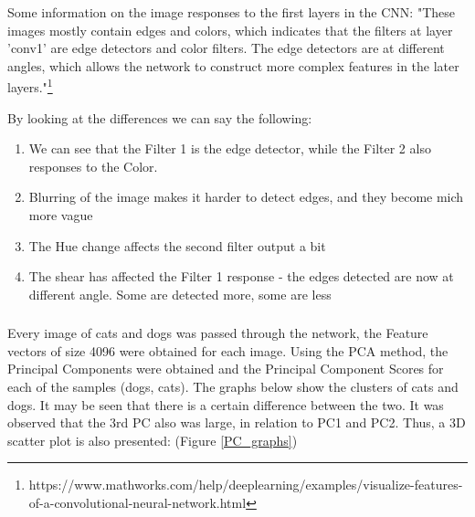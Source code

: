 \documentclass[a4paper]{iacas}
\begin{document}
Some information on the image responses to the first layers in the CNN:
"These images mostly contain edges and colors, which indicates that the filters at layer 'conv1' are edge detectors and color filters. The edge detectors are at different angles, which allows the network to construct more complex features in the later layers."\footnote{https://www.mathworks.com/help/deeplearning/examples/visualize-features-of-a-convolutional-neural-network.html }

By looking at the differences we can say the following:

\begin{enumerate}
\item We can see that the Filter 1 is the edge detector, while the Filter 2 also responses to the Color.
\item Blurring of the image makes it harder to detect edges, and they become mich more vague
\item The Hue change affects the second filter output a bit
\item The shear has affected the Filter 1 response - the edges detected are now at different angle. Some are detected more, some are less
\end{enumerate}



\subsubsection{}
Every image of cats and dogs was passed through the network, the Feature vectors of size 4096 were obtained for each image. Using the PCA method, the Principal Components were obtained and the Principal Component Scores for each of the samples (dogs, cats). The graphs below show the clusters of cats and dogs. It may be seen that there is a certain difference between the two. It was observed that the 3rd PC also was large, in relation to PC1 and PC2. Thus, a 3D scatter plot is also presented: (Figure \ref{PC_graphs})
\end{document}
